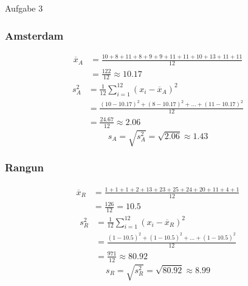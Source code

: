 \documentclass[11pt,a4paper,oneside]{article}
\begin{document}
\begin{loesung}{Aufgabe 3}
\begin{minipage}[t]{0.48\textwidth}
				\subsubsection*{Amsterdam}
				\vspace{-3mm}
				{
					\begin{align*}
						\overline{x}_A &= \tfrac{10 + 8 + 11 + 8 + 9 + 9 + 11 + 11 + 10 + 13 + 11 + 11}{12} \\
						&= \boxed{\tfrac{122}{12} \approx 10.17}
					\end{align*}
				}
				{\footnotesize %
					\begin{align*}
						s_A^2 &= \frac{1}{12}\sum_{i=1}^{12}(x_i-\overline{x}_A)^2 \\
						&= \frac{(10-10.17)^2 + (8-10.17)^2 + \dots + (11-10.17)^2}{12} \\
						&= \frac{24.67}{12} \approx \boxed{2.06}
					\end{align*}
				}%
				\[
				s_A = \sqrt{s_A^2} = \boxed{\sqrt{2.06}\approx 1.43}
				\]
			\end{minipage}\hfill
			\begin{minipage}[t]{0.48\textwidth}
				\subsubsection*{Rangun}
				\vspace{-3mm}
				{\footnotesize
				\begin{align*}
					\overline{x}_R &= \frac{1 + 1 + 1 + 2 + 13 + 23 + 25 + 24 + 20 + 11 + 4 + 1}{12} \\
					&= \boxed{\tfrac{126}{12} = 10.5}
				\end{align*}
				}
				{\footnotesize
					\begin{align*}
						s_R^2 &= \frac{1}{12}\sum_{i=1}^{12}(x_i-\overline{x}_R)^2 \\
						&= \frac{(1-10.5)^2 + (1-10.5)^2 + \dots + (1-10.5)^2}{12} \\
						&= \frac{971}{12} \approx \boxed{80.92}
					\end{align*}
				}
				\[
				s_R = \sqrt{s_R^2} = \boxed{\sqrt{80.92}\approx 8.99}
				\]
			\end{minipage}
	\end{loesung}
	
	\newpage
	
\end{document}
